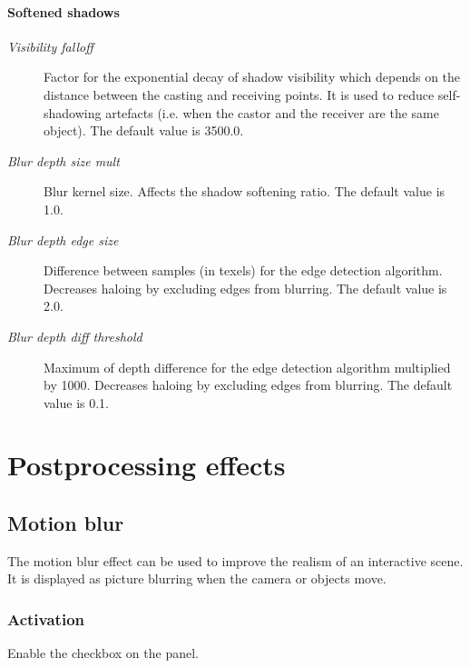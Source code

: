 \documentclass[a4paper,12pt,oneside]{sphinxmanual}
\begin{document}
\subsubsection{Softened shadows}
\label{lighting:id12}\begin{description}
\item[{\emph{Visibility falloff}}] \leavevmode
Factor for the exponential decay of shadow visibility which depends on the distance between the casting and receiving points. It is used to reduce self-shadowing artefacts (i.e. when the castor and the receiver are the same object). The default value is 3500.0.

\item[{\emph{Blur depth size mult}}] \leavevmode
Blur kernel size. Affects the shadow softening ratio. The default value is 1.0.

\item[{\emph{Blur depth edge size}}] \leavevmode
Difference between samples (in texels) for the edge detection algorithm. Decreases haloing by excluding edges from blurring. The default value is 2.0.

\item[{\emph{Blur depth diff threshold}}] \leavevmode
Maximum of depth difference for the edge detection algorithm multiplied by 1000. Decreases haloing by excluding edges from blurring. The default value is 0.1.

\end{description}


\chapter{Postprocessing effects}
\label{postprocessing_effects:postprocessing-effects}\label{postprocessing_effects::doc}\label{postprocessing_effects:id1}

\section{Motion blur}
\label{postprocessing_effects:id2}\label{postprocessing_effects:motion-blur}\label{postprocessing_effects:index-0}
The motion blur effect can be used to improve the realism of an interactive scene. It is displayed as picture blurring when the camera or objects move.


\subsection{Activation}
\label{postprocessing_effects:id3}
Enable the  checkbox on the  panel.
\end{document}
